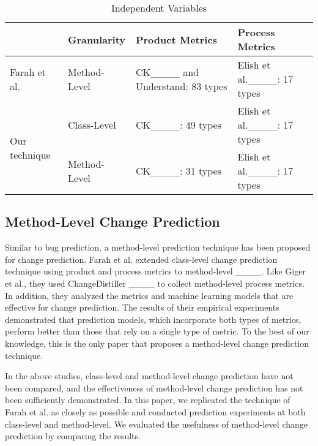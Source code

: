 \begin{table*}[tb]\centering
    \caption{Independent Variables}\label{tab:metrics}
    \begin{tabular}{llll} \hline
         & Granularity & Product Metrics & Process Metrics \\ \hline
        Farah et al. & Method-Level & CK____ and Understand: 83 types & Elish et al.____: 17 types \\
        \hline
        \multirow{2}{*}{Our technique} & Class-Level & CK____: 49 types & Elish et al.____: 17 types  \\
        & Method-Level & CK____: 31 types & Elish et al.____: 17 types \\
        \hline
    \end{tabular}
\end{table*}

\subsection{Method-Level Change Prediction}
Similar to bug prediction, a method-level prediction technique has been proposed for change prediction. 
Farah et al. extended class-level change prediction technique using product and process metrics to method-level ____.
Like Giger et al., they used ChangeDistiller ____ to collect method-level process metrics. 
In addition, they analyzed the metrics and machine learning models that are effective for change prediction.
The results of their empirical experiments demonstrated that prediction models, which incorporate both types of metrics, perform better than those that rely on a single type of metric.
To the best of our knowledge, this is the only paper that proposes a method-level change prediction technique.

In the above studies, class-level and method-level change prediction have not been compared, and the effectiveness of method-level change prediction has not been sufficiently demonstrated. 
In this paper, we replicated the technique of Farah et al. as closely as possible and conducted prediction experiments at both class-level and method-level.
We evaluated the usefulness of method-level change prediction by comparing the results.